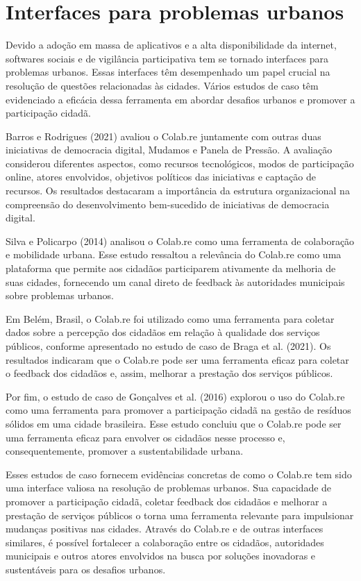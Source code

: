 \section*{Interfaces para problemas urbanos}
Devido a adoção em massa de aplicativos e a alta disponibilidade da internet, softwares sociais e de vigilância participativa tem se tornado interfaces para problemas urbanos. Essas interfaces têm desempenhado um papel crucial na resolução de questões relacionadas às cidades. Vários estudos de caso têm evidenciado a eficácia dessa ferramenta em abordar desafios urbanos e promover a participação cidadã.

Barros e Rodrigues (2021) avaliou o Colab.re juntamente com outras duas iniciativas de democracia digital, Mudamos e Panela de Pressão. A avaliação considerou diferentes aspectos, como recursos tecnológicos, modos de participação online, atores envolvidos, objetivos políticos das iniciativas e captação de recursos. Os resultados destacaram a importância da estrutura organizacional na compreensão do desenvolvimento bem-sucedido de iniciativas de democracia digital.

Silva e Policarpo (2014) analisou o Colab.re como uma ferramenta de colaboração e mobilidade urbana. Esse estudo ressaltou a relevância do Colab.re como uma plataforma que permite aos cidadãos participarem ativamente da melhoria de suas cidades, fornecendo um canal direto de feedback às autoridades municipais sobre problemas urbanos.

Em Belém, Brasil, o Colab.re foi utilizado como uma ferramenta para coletar dados sobre a percepção dos cidadãos em relação à qualidade dos serviços públicos, conforme apresentado no estudo de caso de Braga et al. (2021). Os resultados indicaram que o Colab.re pode ser uma ferramenta eficaz para coletar o feedback dos cidadãos e, assim, melhorar a prestação dos serviços públicos.

Por fim, o estudo de caso de Gonçalves et al. (2016) explorou o uso do Colab.re como uma ferramenta para promover a participação cidadã na gestão de resíduos sólidos em uma cidade brasileira. Esse estudo concluiu que o Colab.re pode ser uma ferramenta eficaz para envolver os cidadãos nesse processo e, consequentemente, promover a sustentabilidade urbana.

Esses estudos de caso fornecem evidências concretas de como o Colab.re tem sido uma interface valiosa na resolução de problemas urbanos. Sua capacidade de promover a participação cidadã, coletar feedback dos cidadãos e melhorar a prestação de serviços públicos o torna uma ferramenta relevante para impulsionar mudanças positivas nas cidades. Através do Colab.re e de outras interfaces similares, é possível fortalecer a colaboração entre os cidadãos, autoridades municipais e outros atores envolvidos na busca por soluções inovadoras e sustentáveis para os desafios urbanos.

